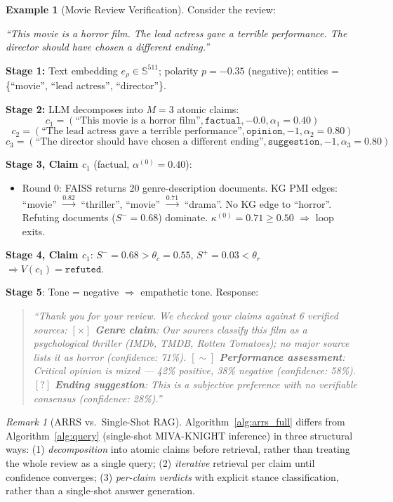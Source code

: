 \documentclass[12pt,a4paper]{article}
\theoremstyle{definition}
\newtheorem{example}{Example}[section]
\theoremstyle{plain}
\theoremstyle{remark}
\newtheorem{remark}{Remark}[section]
\newcommand{\Sph}{\mathbb{S}}
\begin{document}
\begin{example}[Movie Review Verification]
\label{ex:movie_review}
Consider the review:
\begin{center}
  \textit{``This movie is a horror film. The lead actress gave a terrible performance. 
  The director should have chosen a different ending.''}
\end{center}

\textbf{Stage 1:} Text embedding $e_\rho \in \Sph^{511}$; 
polarity $p = -0.35$ (negative); entities = \{``movie'', ``lead actress'', ``director''\}.

\textbf{Stage 2:} LLM decomposes into $M = 3$ atomic claims:
\[
  c_1 = (\text{``This movie is a horror film''}, \mathtt{factual}, -0.0, \alpha_1 = 0.40)
\]
\[
  c_2 = (\text{``The lead actress gave a terrible performance''}, \mathtt{opinion}, -1, \alpha_2 = 0.80)
\]
\[
  c_3 = (\text{``The director should have chosen a different ending''}, \mathtt{suggestion}, -1, \alpha_3 = 0.80)
\]

\textbf{Stage 3, Claim $c_1$} (factual, $\alpha^{(0)}=0.40$):
\begin{itemize}[nosep]
  \item Round 0: FAISS returns 20 genre-description documents. KG PMI edges: 
        ``movie'' $\xrightarrow{0.82}$ ``thriller'', ``movie'' $\xrightarrow{0.71}$ ``drama''. 
        No KG edge to ``horror''. Refuting documents ($S^- = 0.68$) dominate.
        $\kappa^{(0)} = 0.71 \ge 0.50$ $\Rightarrow$ loop exits.
\end{itemize}

\textbf{Stage 4, Claim $c_1$}: $S^- = 0.68 > \theta_c = 0.55$, $S^+ = 0.03 < \theta_r$ 
$\Rightarrow V(c_1) = \mathtt{refuted}$.

\textbf{Stage 5}: Tone = negative $\Rightarrow$ empathetic tone. Response:
\begin{quote}
  \textit{``Thank you for your review. We checked your claims against 6 verified sources: 
  $[\times]$ \textbf{Genre claim}: Our sources classify this film as a psychological 
  thriller (IMDb, TMDB, Rotten Tomatoes); no major source lists it as horror (confidence: 71\%).  
  $[\sim]$ \textbf{Performance assessment}: Critical opinion is mixed --- 42\% positive, 
  38\% negative (confidence: 58\%). $[?]$ \textbf{Ending suggestion}: This is a subjective 
  preference with no verifiable consensus (confidence: 28\%).''}
\end{quote}
\end{example}

\begin{remark}[ARRS vs.\ Single-Shot RAG]
Algorithm~\ref{alg:arrs_full} differs from Algorithm~\ref{alg:query} 
(single-shot MIVA-KNIGHT inference) in three structural ways: 
(1) \emph{decomposition} into atomic claims before retrieval, rather than treating 
the whole review as a single query; (2) \emph{iterative} retrieval per claim 
until confidence converges; (3) \emph{per-claim verdicts} with explicit stance 
classification, rather than a single-shot answer generation.
\end{remark}
\end{document}
